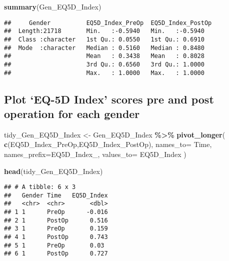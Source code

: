 \documentclass[
]{article}
\newenvironment{Shaded}{\begin{snugshade}}{\end{snugshade}}
\newcommand{\AttributeTok}[1]{\textcolor[rgb]{0.13,0.29,0.53}{#1}}
\newcommand{\FunctionTok}[1]{\textcolor[rgb]{0.13,0.29,0.53}{\textbf{#1}}}
\newcommand{\NormalTok}[1]{#1}
\newcommand{\OtherTok}[1]{\textcolor[rgb]{0.56,0.35,0.01}{#1}}
\newcommand{\SpecialCharTok}[1]{\textcolor[rgb]{0.81,0.36,0.00}{\textbf{#1}}}
\newcommand{\StringTok}[1]{\textcolor[rgb]{0.31,0.60,0.02}{#1}}
\begin{document}
\begin{Shaded}
\begin{Highlighting}[]
\FunctionTok{summary}\NormalTok{(Gen\_EQ5D\_Index)}
\end{Highlighting}
\end{Shaded}

\begin{verbatim}
##     Gender          EQ5D_Index_PreOp  EQ5D_Index_PostOp
##  Length:21718       Min.   :-0.5940   Min.   :-0.5940  
##  Class :character   1st Qu.: 0.0550   1st Qu.: 0.6910  
##  Mode  :character   Median : 0.5160   Median : 0.8480  
##                     Mean   : 0.3438   Mean   : 0.8028  
##                     3rd Qu.: 0.6560   3rd Qu.: 1.0000  
##                     Max.   : 1.0000   Max.   : 1.0000
\end{verbatim}

\subsection{Plot `EQ-5D Index' scores pre and post operation for each
gender}\label{plot-eq-5d-index-scores-pre-and-post-operation-for-each-gender}

\begin{Shaded}
\begin{Highlighting}[]
\NormalTok{tidy\_Gen\_EQ5D\_Index }\OtherTok{\textless{}{-}}\NormalTok{ Gen\_EQ5D\_Index }\SpecialCharTok{\%\textgreater{}\%}
  \FunctionTok{pivot\_longer}\NormalTok{(}
    \FunctionTok{c}\NormalTok{(}\StringTok{\textquotesingle{}EQ5D\_Index\_PreOp\textquotesingle{}}\NormalTok{,}\StringTok{\textquotesingle{}EQ5D\_Index\_PostOp\textquotesingle{}}\NormalTok{),}
    \AttributeTok{names\_to=} \StringTok{\textquotesingle{}Time\textquotesingle{}}\NormalTok{,}
    \AttributeTok{names\_prefix=}\StringTok{\textquotesingle{}EQ5D\_Index\_\textquotesingle{}}\NormalTok{,}
    \AttributeTok{values\_to=} \StringTok{\textquotesingle{}EQ5D\_Index\textquotesingle{}}
\NormalTok{    )}

\FunctionTok{head}\NormalTok{(tidy\_Gen\_EQ5D\_Index)}
\end{Highlighting}
\end{Shaded}

\begin{verbatim}
## # A tibble: 6 x 3
##   Gender Time   EQ5D_Index
##   <chr>  <chr>       <dbl>
## 1 1      PreOp      -0.016
## 2 1      PostOp      0.516
## 3 1      PreOp       0.159
## 4 1      PostOp      0.743
## 5 1      PreOp       0.03 
## 6 1      PostOp      0.727
\end{verbatim}
\end{document}
